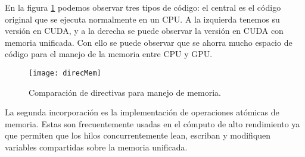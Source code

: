      En la figura \ref{fig:direcMem} podemos observar tres tipos de código: el central es el código original que se ejecuta normalmente en un CPU. A la izquierda tenemos su versión en CUDA, y a la derecha se puede observar la versión en CUDA con memoria unificada. Con ello se puede observar que se ahorra mucho espacio de código para el manejo de la memoria entre CPU y GPU.
       \newline
       
  \begin{figure}[ht]
      \centering
        \texttt{[image: direcMem]}
        \caption{Comparación de directivas para manejo de memoria.}
        \label{fig:direcMem}
    \end{figure}
     
    La segunda incorporación es la implementación de operaciones atómicas de memoria. Estas son frecuentemente usadas en el cómputo de alto rendimiento ya que permiten que los hilos concurrentemente lean, escriban y modifiquen variables compartidas sobre la memoria unificada.
     
     

        
    
